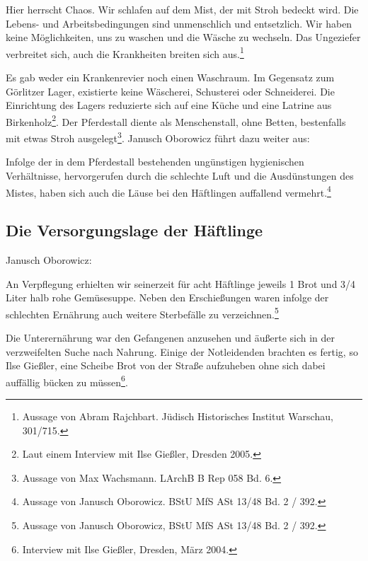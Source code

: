 \begin{leftbar} 
Hier herrscht Chaos. Wir schlafen auf dem Mist, der mit Stroh bedeckt wird. Die Lebens- und Arbeitsbedingungen sind unmenschlich und entsetzlich. Wir haben keine Möglichkeiten, uns zu waschen und die Wäsche zu wechseln. Das Ungeziefer verbreitet sich, auch die Krankheiten breiten sich aus.\footnote{Aussage von Abram Rajchbart. Jüdisch Historisches Institut Warschau, 301/715.}
\end{leftbar}

Es gab weder ein Krankenrevier noch einen Waschraum. Im Gegensatz zum Görlitzer Lager, existierte keine Wäscherei, Schusterei oder Schneiderei. Die Einrichtung des Lagers reduzierte sich auf eine Küche und eine Latrine aus Birkenholz\footnote{Laut einem Interview  mit Ilse Gießler, Dresden 2005.}. Der Pferdestall diente als \glqq Menschenstall\grqq, ohne Betten, bestenfalls mit etwas Stroh ausgelegt\footnote{Aussage von Max Wachsmann. LArchB B Rep 058 Bd. 6.}. Janusch Oborowicz führt dazu weiter aus:

\begin{leftbar} 
Infolge der in dem Pferdestall bestehenden ungünstigen hygienischen Verhältnisse, hervorgerufen durch die schlechte Luft und die Ausdünstungen des Mistes, haben sich auch die Läuse bei den Häftlingen auffallend vermehrt.\footnote{Aussage von Janusch Oborowicz. BStU MfS ASt 13/48 Bd. 2 / 392.}
\end{leftbar}




\subsection{Die Versorgungslage der Häftlinge}


Janusch Oborowicz:
\begin{leftbar} 
An Verpflegung erhielten wir seinerzeit für acht Häftlinge jeweils 1 Brot und 3/4 Liter halb rohe Gemüsesuppe. Neben den Erschießungen waren infolge der schlechten Ernährung auch weitere Sterbefälle zu verzeichnen.\footnote{Aussage von Janusch Oborowicz, BStU MfS ASt 13/48 Bd. 2 / 392.}
\end{leftbar}

Die Unterernährung war den Gefangenen anzusehen und äußerte sich in der verzweifelten Suche nach Nahrung. Einige der Notleidenden brachten es fertig, so Ilse Gießler, eine Scheibe Brot von der Straße aufzuheben ohne sich dabei auffällig bücken zu müssen\footnote{Interview mit Ilse Gießler, Dresden, März 2004.}. 

